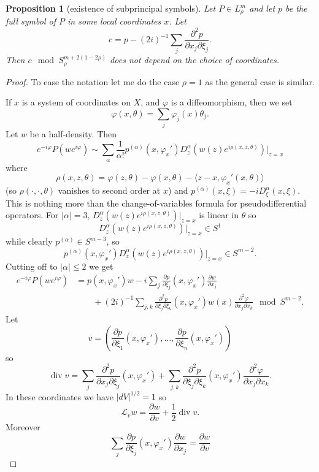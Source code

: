 \documentclass[reqno,12pt,letterpaper]{amsart}
\newtheorem{proposition}[theorem]{Proposition}
\theoremstyle{definition}
\begin{document}
\begin{proposition}[existence of subprincipal symbols]
Let $P \in L^m_\rho$ and let $p$ be the full symbol of $P$ in some local coordinates $x$. Let
$$c = p - (2i)^{-1}\sum_j \frac{\partial^2 p}{\partial x_j \partial \xi_j}.$$
Then $c \mod S^{m + 2(1 - 2\rho)}_\rho$ does not depend on the choice of coordinates.
\end{proposition}
\begin{proof}
To ease the notation let me do the case $\rho = 1$ as the general case is similar.

If $x$ is a system of coordinates on $X$, and $\varphi$ is a diffeomorphism, then we set
$$\varphi(x, \theta) = \sum_j \varphi_j(x) \theta_j.$$
Let $w$ be a half-density. Then
$$e^{-i\varphi}P(we^{i\varphi}) \sim \sum_\alpha \frac{1}{\alpha!} p^{(\alpha)}(x, \varphi_x')D^\alpha_z(w(z) e^{i\rho(x, z, \theta)})|_{z = x}$$
where
$$\rho(x, z, \theta) = \varphi(z, \theta) - \varphi(x, \theta) - \langle z - x, \varphi_x'(x, \theta)\rangle$$
(so $\rho(\cdot, \cdot, \theta)$ vanishes to second order at $x$)
and $p^{(\alpha)}(x, \xi) = -iD_\xi^\alpha(x, \xi)$.
This is nothing more than the change-of-variables formula for pseudodifferential operators.
For $|\alpha| = 3$, $D^\alpha_z(w(z) e^{i\rho(x, z, \theta)})|_{z = x}$ is linear in $\theta$ so
$$D^\alpha_z(w(z) e^{i\rho(x, z, \theta)})|_{z = x} \in S^1$$
while clearly $p^{(\alpha)} \in S^{m - 3}$, so
$$p^{(\alpha)}(x, \varphi_x') D^\alpha_z(w(z) e^{i\rho(x, z, \theta)})|_{z = x} \in S^{m - 2}.$$
Cutting off to $|\alpha| \leq 2$ we get
\begin{align*}
e^{-i\varphi}P(we^{i\varphi}) &= p(x, \varphi_x')w - i\sum_j \frac{\partial p}{\partial \xi_j}(x, \varphi_x')\frac{\partial w}{\partial x_j}\\
&\qquad + (2i)^{-1} \sum_{j,k} \frac{\partial^2 p}{\partial \xi_j \partial \xi_k}(x, \varphi_x') w(x) \frac{\partial^2 \varphi}{\partial x_j \partial x_k} \mod S^{m - 2}.
\end{align*}
Let
$$v = \left(\frac{\partial p}{\partial \xi_1}(x, \varphi_x'), \dots, \frac{\partial p}{\partial \xi_n}(x, \varphi_x')\right)$$
so
$$\operatorname{div} v = \sum_j \frac{\partial^2 p}{\partial x_j \partial \xi_j}(x, \varphi_x') + \sum_{j,k} \frac{\partial^2 p}{\partial \xi_j \partial \xi_k}(x, \varphi_x') \frac{\partial^2 \varphi}{\partial x_j \partial x_k}.$$
In these coordinates we have $|dV|^{1/2} = 1$ so
$$\mathcal L_vw = \frac{\partial w}{\partial v} + \frac{1}{2} \operatorname{div} v.$$
Moreover
$$\sum_j \frac{\partial p}{\partial \xi_j}(x, \varphi_x')\frac{\partial w}{\partial x_j} = \frac{\partial w}{\partial v}$$

\end{proof}
\end{document}
